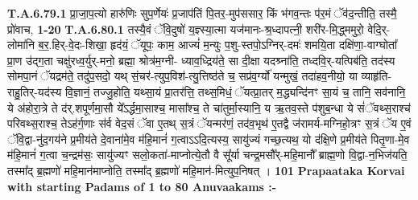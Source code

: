 \documentclass[17pt]{extarticle}
\begin{document}
                                \textbf{ T.A.6.79.1} \newline
                  प्रा॒जा॒प॒त्यो हारु॑णिः सुप॒र्णेयः॑ प्र॒जाप॑तिं पि॒तर॒-मुप॑ससार॒ किं भ॑गव॒न्तः प॑र॒मं ॅव॑द॒न्तीति॒ तस्मै॒ प्रो॑वाच, \textbf{ 1-20} \newline
                  \newline
                                                         \textbf{} \newline \newline
                                \textbf{ T.A.6.80.1} \newline
                  तस्यै॒वं ॅवि॒दुषो॑ य॒ज्ञ्स्या॒त्मा यज॑मानः-श्र॒ध्दापत्नी॒ शरी॑र-मि॒द्ध्ममुरो॒ वेदि॒र्-लोमा॑नि ब॒र॒.हिर्-वे॒दः-शिखा॒ हृद॑यं॒ ॅयूपः॒ काम॒ आज्यं॑ म॒न्युः प॒शु-स्तपो॒ऽग्निर्-दमः॑ शमयि॒ता दक्षि॑णा॒-वाग्घोता᳚ प्रा॒ण उ॑द्ग॒ता चक्षु॑रध्व॒र्युर्-मनो॒ ब्रह्मा॒ श्रोत्र॑म॒ग्नी-  ध्याव॒ध्द्रिय॑ते॒ सा दी॒क्षा यदश्र्ना॑ति॒ तध्दवि॒र्-यत्पिब॑ति॒ तद॑स्य सोमपा॒नं ॅयद्रम॑ते॒ तदु॑प॒सदो॒ यथ् सं॒चर॑-त्युप॒विश॑-त्यु॒त्तिष्ठ॑ते च॒ सप्र॑व॒र्ग्यो॑ यन्मुखं॒ तदा॑हव॒नीयो॒ या व्याहृ॑ति-राहु॒तिर्-यद॑स्य वि॒ज्ञानं॒ तज्जु॒होति॒ यथ्सा॒यं प्रा॒तर॑त्ति॒ तथ्स॒मिधं॒ ॅयत्प्रा॒तर् म॒द्ध्यन्दि॑नꣳ सा॒यं च॒ तानि॒ सव॑नानि॒    ये अ॑होरा॒त्रे ते द॑र्.शपूर्णमा॒सौ ये᳚ऽर्द्धमा॒साश्च॒ मासा᳚श्च॒ ते चा॑तुर्मा॒स्यानि॒ य ऋ॒तव॒स्ते प॑शुब॒न्धा ये सं॑ॅवथ्स॒राश्च॑ परिवथ्स॒राश्च॒ तेऽह॑र्ग॒णाः स॑र्व वेद॒सं ॅवा ए॒तथ् स॒त्रं ॅयन्मर॑णं॒ तद॑व॒भृथ॑   ए॒तद्वै ज॑रामर्य-मग्निहो॒त्रꣳ स॒त्रं ॅय ए॒वं ॅवि॒द्वा-नु॑द॒गय॑ने प्र॒मीय॑ते दे॒वाना॑मे॒व म॑हि॒मानं॑ ग॒त्वाऽऽदि॒त्यस्य॒ सायु॑ज्यं गच्छ॒त्यथ॒ यो द॑क्षि॒णे प्र॒मीय॑ते पितृ॒णा-मे॒व म॑हि॒मानं॑ ग॒त्वा च॒न्द्रम॑सः॒ सायु॑ज्यꣳ सलो॒कता॑-माप्नोत्ये॒तौ वै सू᳚र्या चन्द्र॒मसौ᳚र्-महि॒मानौ᳚ ब्राह्म॒णो वि॒द्वा-न॒भिज॑यति॒ तस्मा᳚द् ब्र॒ह्मणो॑ महि॒मान॑माप्नोति॒ तस्मा᳚द् ब्र॒ह्मणो॑ महि॒मान॑-मित्युप॒निषत् । \textbf{ 101} \newline
                  \newline
                                                         \textbf{} \newline \newline
\textbf{Prapaataka Korvai with starting Padams of 1 to 80 Anuvaakams :-} \newline
\end{document}
